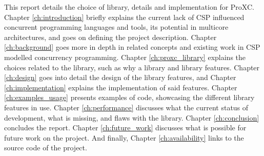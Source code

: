 This report details the choice of library, details and implementation for ProXC. Chapter \ref{ch:introduction} briefly explains the current lack of CSP influenced concurrent programming languages and tools, its potential in multicore architectures, and goes on defining the project description. Chapter \ref{ch:background} goes more in depth in related concepts and existing work in CSP modelled concurrency programming. Chapter \ref{ch:proxc_library} explains the choices related to the library, such as why a library and library features. Chapter \ref{ch:design} goes into detail the design of the library features, and Chapter \ref{ch:implementation} explains the implementation of said features. Chapter \ref{ch:examples_usage} presents examples of code, showcasing the different library features in use. Chapter \ref{ch:performance} discusses what the current status of development, what is missing, and flaws with the library. Chapter \ref{ch:conclusion} concludes the report. Chapter \ref{ch:future_work} discusses what is possible for future work on the project. And finally, Chapter \ref{ch:availability} links to the source code of the project.

